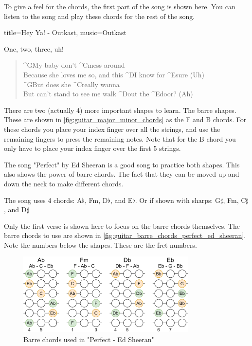 To give a feel for the chords, the first part of the song is shown here. You can listen to the song and play these chords for the rest of the song.

\begin{song}[verse/numbered, align-chords=l]{title={Hey Ya! - Outkast}, music={Outkast}}
	\begin{intro}
		One, two, three, uh!
	\end{intro}
	\begin{verse}
		^{G}My baby don't ^{C}mess around \\
		Because she loves me so, and this ^{D}I know for ^{E}sure (Uh) \\
		^{G}But does she ^{C}really wanna \\
		But can't stand to see me walk ^{D}out the ^{E}door? (Ah) \\
	\end{verse}
\end{song}

\newpage

There are two (actually 4) more important shapes to learn. The barre shapes. These are shown in \autoref{fig:guitar_major_minor_chords} as the F and B chords. For these chords you place your index finger over all the strings, and use the remaining fingers to press the remaining notes. Note that for the B chord you only have to place your index finger over the first 5 strings.

The song "Perfect" by Ed Sheeran is a good song to practice both shapes. This also shows the power of barre chords. The fact that they can be moved up and down the neck to make different chords.

The song uses 4 chords: A$\flat$, Fm, D$\flat$, and E$\flat$. Or if shown with sharps: G$\sharp$, Fm, C$\sharp$, and D$\sharp$

Only the first verse is shown here to focus on the barre chords themselves. The barre chords to use are shown in \autoref{fig:guitar_barre_chords_perfect_ed_sheeran}. Note the numbers below the shapes. These are the fret numbers.


\begin{figure}[h]
	\centering
	\includegraphics[width=0.8\textwidth]{../../Images/ChordsUsedInPerfectEdSheeran.png}
	\caption{Barre chords used in "Perfect - Ed Sheeran"}
	\label{fig:guitar_barre_chords_perfect_ed_sheeran}
\end{figure}



